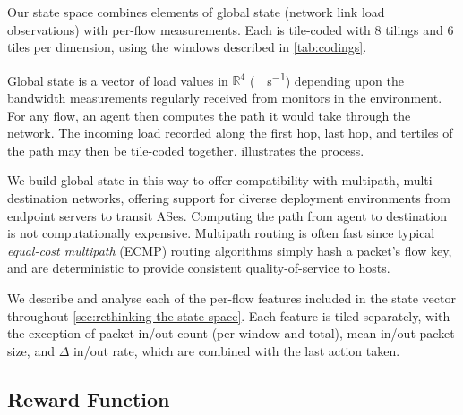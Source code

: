 \documentclass[10pt, times, comsoc]{IEEEtran}
\begin{document}
Our state space combines elements of global state (network link load observations) with per-flow measurements.
Each is tile-coded with 8 tilings and 6 tiles per dimension, using the windows described in \cref{tab:codings}.

Global state is a vector of load values in $\mathbb{R}^4$ (\si{\mega\bit\per\second}) depending upon the bandwidth measurements regularly received from monitors in the environment.
For any flow, an agent then computes the path it would take through the network.
The incoming load recorded along the first hop, last hop, and tertiles of the path may then be tile-coded together.
 \cbend
{} illustrates the process.

We build global state in this way to offer compatibility with multipath, multi-destination networks, offering support for diverse deployment environments from endpoint servers to transit ASes.
Computing the path from agent to destination is not computationally expensive.
Multipath routing is often fast since typical \emph{equal-cost multipath} (ECMP) routing algorithms simply hash a packet's flow key, and are deterministic to provide consistent quality-of-service to hosts.


We describe and analyse each of the per-flow features included in the state vector throughout \cref{sec:rethinking-the-state-space}.
Each feature is tiled separately, with the exception of packet in/out count (per-window and total), mean in/out packet size, and $\Delta$ in/out rate, which are combined with the last action taken.
 \cbend

\subsection{Reward Function}
\end{document}
